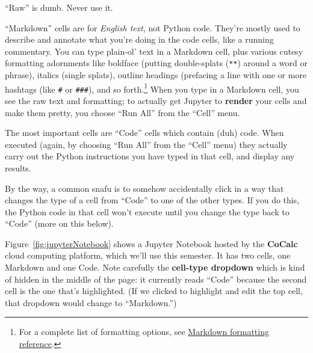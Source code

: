 \begin{description}
\item[Raw.] ``Raw'' is dumb. Never use it.
\item[Markdown.] ``Markdown'' cells are for \textit{English text}, not Python
code. They're mostly used to describe and annotate what you're doing in the
code cells, like a running commentary. You can type plain-ol' text in a
Markdown cell, plus various cutesy formatting adornments like boldface (putting
double-splats (\texttt{**}) around a word or phrase), italics (single splats),
outline headings (prefacing a line with one or more hashtags (like \texttt{\#}
or \texttt{\#\#\#}), and so forth.\footnote{For a complete list of formatting
options, see
\href{https://github.com/adam-p/markdown-here/wiki/Markdown-Cheatsheet}{Markdown formatting reference}.} When
you type in a Markdown cell, you see the raw text and formatting; to actually get Jupyter to
\textbf{render} your cells and make them pretty, you choose ``Run All'' from
the   ``Cell'' menu.

\item[Code.] The most important cells are ``Code'' cells which contain (duh)
code. When executed (again, by choosing ``Run All'' from the ``Cell'' menu) they actually carry out
the Python instructions you have typed in that cell, and display any results.

\end{description}

By the way, a common snafu is to somehow accidentally click in a way that
changes the type of a cell from ``Code'' to one of the other types. If you do
this, the Python code in that cell won't execute until you change the type back
to ``Code'' (more on this below).

Figure~\ref{fig:jupyterNotebook} shows a Jupyter Notebook hosted by the
\textbf{CoCalc} cloud computing platform, which we'll use this semester. It has
two cells, one Markdown and one Code. Note carefully the \textbf{cell-type
dropdown} which is kind of hidden in the middle of the page: it currently reads
``Code'' because the second cell is the one that's highlighted. (If we clicked
to highlight and edit the top cell, that dropdown would change to
``Markdown.'')

